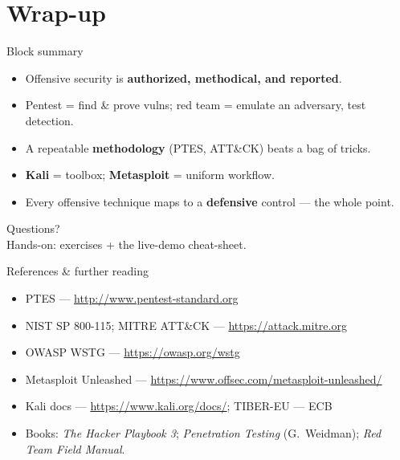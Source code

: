 \documentclass[aspectratio=169,11pt]{beamer}
\begin{document}
\section*{Wrap-up}
\begin{frame}{Block summary}
  \begin{itemize}
    \item Offensive security is \textbf{authorized, methodical, and reported}.
    \item Pentest = find \& prove vulns; red team = emulate an adversary, test
          detection.
    \item A repeatable \textbf{methodology} (PTES, ATT\&CK) beats a bag of tricks.
    \item \textbf{Kali} = toolbox; \textbf{Metasploit} = uniform workflow.
    \item Every offensive technique maps to a \textbf{defensive} control --- the
          whole point.
  \end{itemize}
\end{frame}

\begin{frame}[standout]
  Questions?\\[1em]
  \small Hands-on: exercises + the live-demo cheat-sheet.
\end{frame}

\begin{frame}{References \& further reading}
  \footnotesize
  \begin{itemize}
    \item PTES --- \url{http://www.pentest-standard.org}
    \item NIST SP 800-115; MITRE ATT\&CK --- \url{https://attack.mitre.org}
    \item OWASP WSTG --- \url{https://owasp.org/wstg}
    \item Metasploit Unleashed --- \url{https://www.offsec.com/metasploit-unleashed/}
    \item Kali docs --- \url{https://www.kali.org/docs/}; TIBER-EU --- ECB
    \item Books: \emph{The Hacker Playbook 3}; \emph{Penetration Testing}
          (G.\ Weidman); \emph{Red Team Field Manual}.
  \end{itemize}
\end{frame}
\end{document}
